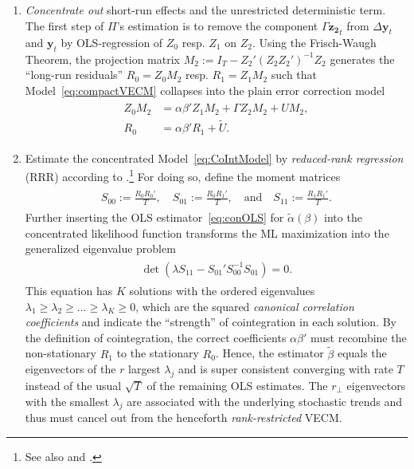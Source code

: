 \begin{enumerate}[label=\textbf{\arabic*.}]
	\item \textit{Concentrate out} short-run effects and the unrestricted deterministic term. The first step of $ \Pi $'s estimation is to remove the component $ \Gamma \boldsymbol{z_2}_t $ from $ \Delta \boldsymbol{y}_t $ and $ \boldsymbol{y}_t $ by OLS-regression of $ Z_0 $ resp. $ Z_1 $ on $ Z_{2} $. Using the Frisch-Waugh Theorem, the projection matrix $ M_2 := I_T - Z_2'(Z^{\ }_2 Z_2')^{-1} Z^{\ }_2 $ generates the ``long-run residuals'' $ R_{0} = Z_{0} M_2 $ resp. $ R_{1} = Z_{1} M_2 $ such that Model~\eqref{eq:compactVECM} collapses into the plain error correction model
	\begin{align} \label{eq:CoIntModel}
	\begin{split}
		Z_{0} M_2 & = \alpha\beta' Z_{1} M_2 + \Gamma Z_{2} M_2 + U M_2, \\
		R_{0} & = \alpha\beta' R_{1} + \widetilde{U}.
	\end{split}
	\end{align} 
	\item Estimate the concentrated Model~\eqref{eq:CoIntModel} by \textit{reduced-rank regression} (RRR) according to \citet{Anderson1951}.\footnote{See also \citet[Ch.~12.7]{Anderson2003} and \citet{Izenman1975}.} For doing so, define the moment matrices
	\begin{align} \label{eq:RRRmomat}
	\begin{split}
		S_{00} := \frac{R^{\ }_0 R_0'}{T}, \quad S_{01} := \frac{R^{\ }_0 R_1'}{T}, \quad \text{and} \quad S_{11} := \frac{R^{\ }_1 R_1'}{T}.
	\end{split}
	\end{align}
	Further inserting the OLS estimator~\eqref{eq:conOLS} for $ \widetilde{\alpha}(\beta) $ into the concentrated likelihood function transforms the ML maximization into the generalized eigenvalue problem
	\begin{align} \label{eq:RRReigen}
	\begin{split}
		\det \left( \lambda S_{11}^{\ } - S_{01}' S_{00}^{-1} S_{01}^{\ } \right) = 0.
	\end{split}
	\end{align} 
	This equation has $ K $ solutions with the ordered eigenvalues $ \lambda_1 \geq \lambda_2 \geq \ldots \geq \lambda_K \geq 0 $, which are the squared \textit{canonical correlation coefficients} and indicate the ``strength'' of cointegration in each solution. By the definition of cointegration, the correct coefficients $ \alpha\beta' $ must recombine the non-stationary $ R_{1} $ to the stationary $ R_{0} $. Hence, the estimator $ \widetilde{\beta} $ equals the eigenvectors of the $ r $ largest $ \lambda_j $ and is super consistent converging with rate $ T $ instead of the usual $ \sqrt{T} $ of the remaining OLS estimates. The $ r_\perp $ eigenvectors with the smallest $ \lambda_j $ are associated with the underlying stochastic trends and thus must cancel out from the henceforth \textit{rank-restricted} VECM.
	

\end{enumerate}
